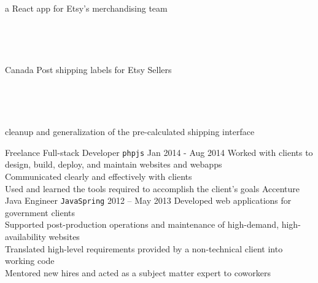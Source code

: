 \documentclass[9pt]{developercv} %
\begin{document}
\begin{entrylist}
{            \begin{minipage}[t]{0.05\textwidth}\,\end{minipage}
            \begin{minipage}[t]{0.8\textwidth}a React app for Etsy's merchandising team\end{minipage}\\
            \begin{minipage}[t]{0.05\textwidth}\,\end{minipage}
            \begin{minipage}[t]{0.8\textwidth}Canada Post shipping labels for Etsy Sellers\end{minipage}\\
            \begin{minipage}[t]{0.05\textwidth}\,\end{minipage}
            \begin{minipage}[t]{0.8\textwidth}cleanup and generalization of the pre-calculated shipping interface\end{minipage}
        }
    \entry
        {Freelance}
        {Full-stack Developer \hspace{1mm}\texttt{php}\slashsep\texttt{js}}
        {Jan 2014 - Aug 2014}
        {
            Worked with clients to design, build, deploy, and maintain websites and webapps\\
            Communicated clearly and effectively with clients\\
            Used and learned the tools required to accomplish the client’s goals
        }
    \entry
        {Accenture}
        {Java Engineer \hspace{1mm}\texttt{Java}\slashsep\texttt{Spring}}
        {2012 -- May 2013}
        {
            Developed web applications for government clients\\
            Supported post-production operations and maintenance of high-demand, high-availability websites\\
            Translated high-level requirements provided by a non-technical client into working code\\
            Mentored new hires and acted as a subject matter expert to coworkers
        }
\end{entrylist}

    
\end{document}
